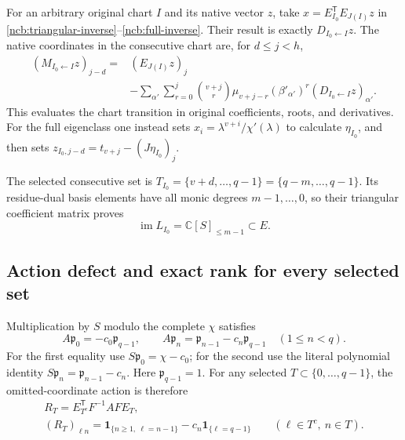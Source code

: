 For an arbitrary original chart $I$ and its native vector $z$, take
$x=E_{I_0}^{\mathsf T}E_{J(I)}z$ in
\eqref{ncb:triangular-inverse}--\eqref{ncb:full-inverse}. Their result
is exactly $D_{I_0\leftarrow I}z$. The native coordinates in the
consecutive chart are, for $d\leq j<h$,
\begin{equation}\tag{NCB28}\label{ncb:explicit-transition}
\begin{split}
(M_{I_0\leftarrow I}z)_{j-d}
={}&(E_{J(I)}z)_j\\
&-\sum_{\alpha'}\sum_{r=0}^{j}
\binom{v+j}{r}\mu_{v+j-r}(\beta'_{\alpha'})^r
                    (D_{I_0\leftarrow I}z)_{\alpha'} .
\end{split}
\end{equation}
This evaluates the chart transition in original coefficients, roots,
and derivatives. For the full eigenclass one instead sets
$x_i=\lambda^{v+i}/\chi'(\lambda)$ to calculate $\eta_{I_0}$,
and then sets
$z_{I_0,j-d}=t_{v+j}-(J\eta_{I_0})_j$.

The selected consecutive set is
$T_{I_0}=\{v+d,\ldots,q-1\}=\{q-m,\ldots,q-1\}$.
Its residue-dual basis elements have all monic degrees
$m-1,\ldots,0$, so their triangular coefficient matrix proves
\begin{equation}\tag{NCB29}\label{ncb:consecutive-image}
\operatorname{im}L_{I_0}=\mathbb C[S]_{\leq m-1}\subset E .
\end{equation}

\subsection{Action defect and exact rank for every selected set}
Multiplication by $S$ modulo the complete $\chi$ satisfies
\begin{equation}\tag{NCB30}\label{ncb:action}
A\mathfrak p_0=-c_0\mathfrak p_{q-1},\qquad
A\mathfrak p_n=\mathfrak p_{n-1}-c_n\mathfrak p_{q-1}
\quad(1\leq n<q).
\end{equation}
For the first equality use $S\mathfrak p_0=\chi-c_0$;
for the second use the literal polynomial identity
$S\mathfrak p_n=\mathfrak p_{n-1}-c_n$.
Here $\mathfrak p_{q-1}=1$.
For any selected $T\subset\{0,\ldots,q-1\}$, the omitted-coordinate
action is therefore
\begin{equation}\tag{NCB31}\label{ncb:RT}
\begin{gathered}
R_T=E_{T^c}^{\mathsf T}F^{-1}AFE_T,\\
(R_T)_{\ell n}
=\mathbf1_{\{n\geq1,\ \ell=n-1\}}
       -c_n\mathbf1_{\{\ell=q-1\}}
\qquad(\ell\in T^c,\ n\in T).
\end{gathered}
\end{equation}

